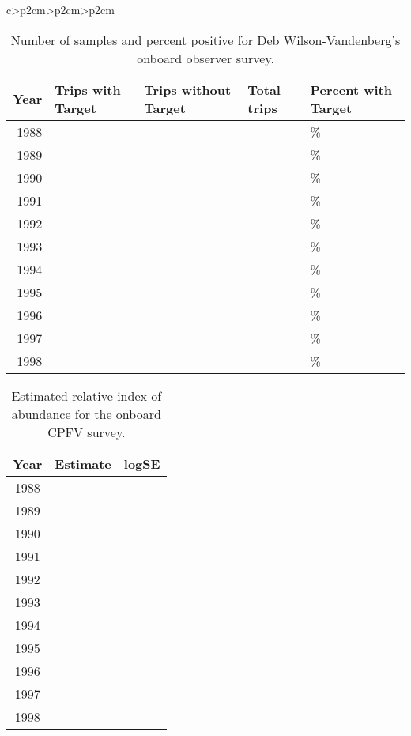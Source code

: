 \documentclass[11pt,
  letterpaper,
]{article}
\begin{document}
\begin{longtable}[t]{c>{\centering\arraybackslash}p{2cm}>{\centering\arraybackslash}p{2cm}>{\centering\arraybackslash}p{2cm}}
\begin{table}[H]
\centering\centering\centering
\caption{\label{tab:deb-percentpos}Number of samples and percent positive for Deb Wilson-Vandenberg's onboard observer survey.}
\centering
\fontsize{10}{12}\selectfont
\fontsize{10}{12}\selectfont
\begin{tabular}[t]{r>{\raggedleft\arraybackslash}p{1.6cm}>{\raggedleft\arraybackslash}p{1.6cm}>{\raggedleft\arraybackslash}p{1.6cm}>{\raggedleft\arraybackslash}p{1.6cm}}
\toprule
Year & Trips with Target & Trips without Target & Total trips & Percent with Target\\
\midrule
1988 & 114 & 276 & 390 & 29.2\%\\
1989 & 162 & 247 & 409 & 39.6\%\\
1990 & 50 & 63 & 113 & 44.2\%\\
1991 & 54 & 78 & 132 & 40.9\%\\
1992 & 160 & 305 & 465 & 34.4\%\\
1993 & 171 & 322 & 493 & 34.7\%\\
1994 & 154 & 436 & 590 & 26.1\%\\
1995 & 216 & 622 & 838 & 25.8\%\\
1996 & 194 & 830 & 1024 & 18.9\%\\
1997 & 202 & 1119 & 1321 & 15.3\%\\
1998 & 127 & 831 & 958 & 13.3\%\\
\bottomrule
\end{tabular}
\end{table}

\begin{table}[H]
\centering\centering\centering
\caption{\label{tab:deb-index}Estimated relative index of abundance for the onboard CPFV survey.}
\centering
\fontsize{10}{12}\selectfont
\fontsize{10}{12}\selectfont
\begin{tabular}[t]{c>{\centering\arraybackslash}p{2cm}>{\centering\arraybackslash}p{2cm}}
\toprule
Year & Estimate & logSE\\
\midrule
1988 & 0.0770 & 0.1418\\
1989 & 0.1147 & 0.1183\\
1990 & 0.1123 & 0.2016\\
1991 & 0.0978 & 0.1939\\
1992 & 0.0997 & 0.1285\\
1993 & 0.0925 & 0.1163\\
1994 & 0.0692 & 0.1273\\
1995 & 0.0684 & 0.1139\\
1996 & 0.0545 & 0.1192\\
1997 & 0.0479 & 0.1263\\
1998 & 0.0414 & 0.1356\\
\bottomrule
\end{tabular}
\end{table}


\end{longtable}
\end{document}
